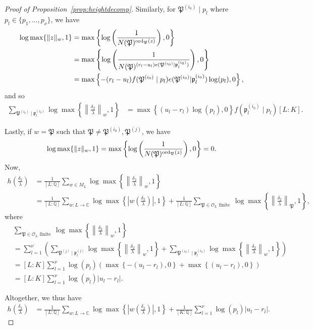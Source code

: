 \begin{proof}[Proof of Proposition~\ref{prop:heightdecomp}]
Similarly, for $\mathfrak{P}^{(i_0)}\mid p_l$ where $p_l \in \{p_1, \dots, p_{\nu}\}$, we have
\begin{align*}
 \log \max \{ \|z\|_{w}, 1\}	
 	& = \max \left\{ \log\left(\frac{1}{N(\mathfrak{P})^{\operatorname{ord}_{\mathfrak{P}}(z)}} \right), 0\right\}\\
	& = \max \left\{ \log\left(\frac{1}{N(\mathfrak{P})^{(r_l - u_l)e(\mathfrak{P}^{(i_0)}|\mathfrak{p}_l^{(i_0)})}} \right), 0\right\}\\
	& = \max \left\{ -(r_l - u_l)f(\mathfrak{P}^{(i_0)}\mid p_l)e(\mathfrak{P}^{(i_0)}|\mathfrak{p}_l^{(i_0)})\log(p_l), 0\right\},
\end{align*}
and so
\begin{align*}
\sum_{\mathfrak{P}^{(i_0)} \mid \mathfrak{p}_l^{(i_0)}} \log \max \left\{ \left\|\frac{\delta_2}{\lambda}\right\|_{w}, 1\right\}
	& = \max \left\{ (u_l - r_l)\log(p_l), 0\right\}f(\mathfrak{p}_l^{(i_0)}\mid p_l)[L:K].
\end{align*}

Lastly, if $w = \mathfrak{P}$ such that $\mathfrak{P} \neq \mathfrak{P}^{(i_0)},  \mathfrak{P}^{(j)}$, we have
\[\log \max \{ \|z\|_{w}, 1\} = \max \left\{ \log\left(\frac{1}{N(\mathfrak{P})^{\operatorname{ord}_{\mathfrak{P}}(z)}} \right), 0\right\}=0.\]
Now, 
\begin{align*}
h\left(\frac{\delta_2}{\lambda}\right)
	& =\frac{1}{[L:\mathbb{Q}]}\sum_{w \in M_L} \log \max \left\{ \left\|\frac{\delta_2}{\lambda}\right\|_{w}, 1\right\}\\
	& = \frac{1}{[L:\mathbb{Q}]}\sum_{w :L \to \mathbb{C}} \log \max \left\{ \left|w\left(\frac{\delta_2}{\lambda}\right)\right|, 1\right\} + \frac{1}{[L:\mathbb{Q}]}\sum_{\mathfrak{P} \in \mathcal{O}_L \text{ finite }} \log \max \left\{ \left\|\frac{\delta_2}{\lambda}\right\|_{\mathfrak{P}}, 1\right\},
\end{align*}
where
\begin{align*}
& \sum_{\mathfrak{P} \in \mathcal{O}_L \text{ finite }} \log \max \left\{ \left\|\frac{\delta_2}{\lambda}\right\|_{w}, 1\right\} \\
	& = \sum_{l = 1}^{\nu} \left(\sum_{\mathfrak{P}^{(j)} \mid \mathfrak{p}_l^{(j)}} \log \max \left\{ \left\|\frac{\delta_2}{\lambda}\right\|_{w}, 1\right\} + \sum_{\mathfrak{P}^{(i_0)} \mid \mathfrak{p}_l^{(i_0)}} \log \max \left\{ \left\|\frac{\delta_2}{\lambda}\right\|_{w}, 1\right\}\right)\\
	& =  [L:K]\sum_{l = 1}^{\nu} \log(p_l)\left(\max \left\{ -(u_l - r_l), 0\right\}+ \max \left\{ (u_l - r_l), 0\right\}\right)\\
	& =  [L:K]\sum_{l = 1}^{\nu} \log(p_l)|u_l - r_l|.
\end{align*}

Altogether, we thus have
\begin{align*}
h\left(\frac{\delta_2}{\lambda}\right)
	& = \frac{1}{[L:\mathbb{Q}]}\sum_{w :L \to \mathbb{C}} \log \max \left\{ \left|w\left(\frac{\delta_2}{\lambda}\right)\right|, 1\right\} + \frac{1}{[K:\mathbb{Q}]}\sum_{l = 1}^{\nu} \log(p_l)|u_l - r_l|.
\end{align*}
\end{proof}

